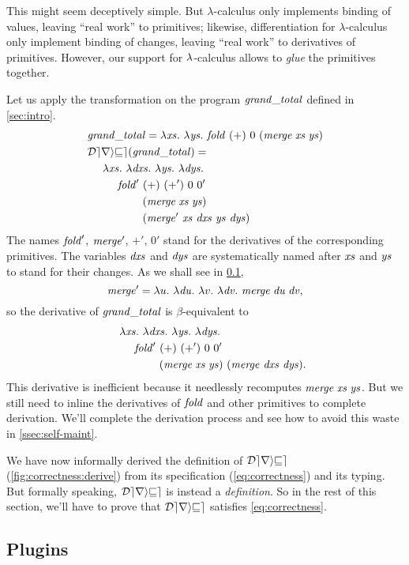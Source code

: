This might seem deceptively simple. But $\lambda$-calculus only
implements binding of values, leaving ``real work'' to
primitives; likewise, differentiation for $\lambda$-calculus only
implement binding of changes, leaving ``real work'' to
derivatives of primitives.
However, our support for
$\lambda$-calculus allows to \emph{glue} the primitives together.

\begin{examples}
Let us apply the transformation on the program $\mathit{grand\_total}$ defined
in \cref{sec:intro}.
{\DeriveProgramEnv
\begin{align*}
&\Program = \ProgramBody\\
&\Derive\Program=\\
&\zero
\Lam{\Xs}{\Lam{\DXs}{}}\Lam{\Ys}{\Lam{\DYs}{}}\\
&\one
\FOLD'~(+)~(+')~0~0'\\
&\two
(\Merge\Xs\Ys)\\
&\two
(\MERGE'~\Xs~\DXs~\Ys~\DYs)
\end{align*}
}%
The names $\mathit{fold}'$, $\mathit{merge}'$, $+'$, $0'$ stand for the
derivatives of the corresponding primitives. The variables
$\mathit{dxs}$ and $\mathit{dys}$ are systematically named after $\mathit{xs}$
and $\mathit{ys}$ to stand for their changes. As we shall see in
\cref{ssec:plugin},
\[
\MERGE'=\Lam{u}{\Lam{\D u}{\Lam{v}{\Lam{\D v}{\Merge{\D u}{\D v}}}}},
\]
so the derivative of $\mathit{grand\_total}$ is $\beta$-equivalent to
{\DeriveProgramEnv
\begin{align*}
&\zero
\Lam{\Xs}{\Lam{\DXs}{}}\Lam{\Ys}{\Lam{\DYs}{}}\\
&\one
\FOLD'~(+)~(+')~0~0'\\
&\two
(\Merge\Xs\Ys)~(\MERGE~\DXs~\DYs).
\end{align*}}%
%
This derivative is inefficient because it needlessly recomputes
$\Merge\Xs\Ys$. But we still need to inline the derivatives of
$\mathit{fold}$ and other primitives to complete derivation. We'll
complete the derivation process and see how to avoid this waste in
\cref{ssec:self-maint}.
\end{examples}

We have now informally
derived the definition of $\mathcal{Derive}$ (\cref{fig:correctness:derive})
from its specification (\cref{eq:correctness}) and
its typing. But formally speaking,
$\mathcal{Derive}$ is instead a \emph{definition}. So in the rest of this section,
we'll have to
prove that $\mathcal{Derive}$ satisfies \cref{eq:correctness}.




\subsection{Plugins}\label{ssec:plugin}

